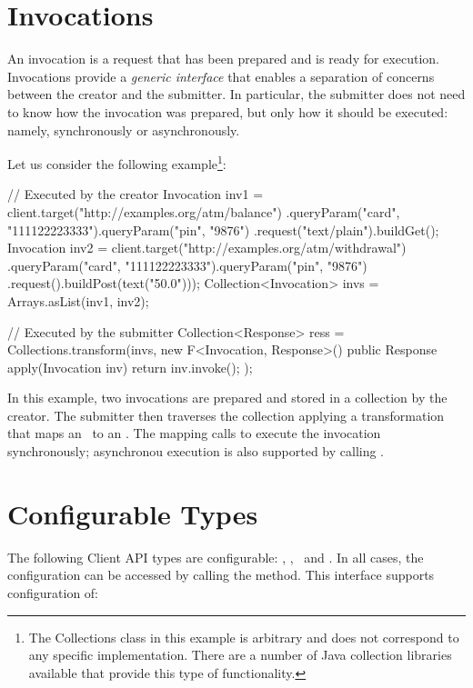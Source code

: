 \section{Invocations}
\label{invocations}

An invocation is a request that has been prepared and is ready for execution. Invocations provide a {\em generic interface} that enables a separation of concerns between the creator and the submitter. In particular, the submitter does not need to know how the invocation was prepared, but only how it should be executed: namely, synchronously or asynchronously.

 Let us consider the following example\footnote{The Collections class in this example is arbitrary and does not correspond to any specific implementation. There are a number of Java collection libraries available that provide this type of functionality.}:

\begin{listing}{1}
// Executed by the creator
Invocation inv1 = client.target("http://examples.org/atm/balance")
    .queryParam("card", "111122223333").queryParam("pin", "9876")
    .request("text/plain").buildGet();
Invocation inv2 = client.target("http://examples.org/atm/withdrawal")
    .queryParam("card", "111122223333").queryParam("pin", "9876")
    .request().buildPost(text("50.0")));
Collection<Invocation> invs = Arrays.asList(inv1, inv2);

// Executed by the submitter
Collection<Response> ress =
    Collections.transform(invs,
        new F<Invocation, Response>() {
             public Response apply(Invocation inv) {
                 return inv.invoke(); } });
\end{listing}

In this example, two invocations are prepared and stored in a collection by the creator. The submitter then traverses the collection applying a transformation that maps an \Invocation\ to an \Response. The mapping calls  to execute the invocation synchronously; asynchronou execution is also supported by calling .

\section{Configurable Types}
\label{configurable_types}

The following Client API types are configurable: \Client, \Invocation, \InvocationBuilder\ and \Target. In all cases, the configuration can be accessed by calling the  method. This interface supports configuration of:

